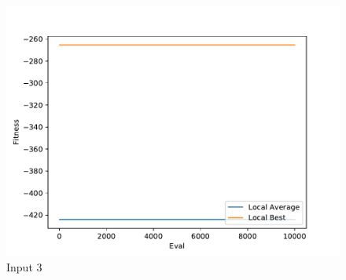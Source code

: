 \documentclass{standalone}
\begin{document}
\begin{figure}[!htb]
	\caption{Input 3}
	\label{fig:graph_3026}
	\includegraphics[width=\textwidth]{../graphs/graphs/3026.pdf}
\end{figure}
\end{document}
